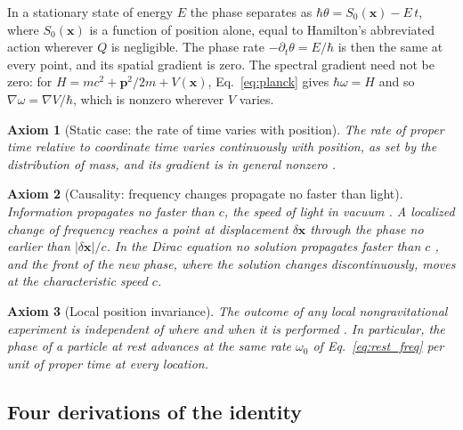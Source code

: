 \documentclass[aps,prd,onecolumn,tightenlines,nofootinbib,notitlepage,11pt,floatfix]{revtex4-2}
\theoremstyle{indentedtheorem}
\newtheorem{axiom}{Axiom}
\begin{document}
\noindent In a stationary state of energy $E$ the phase separates as $\hbar\theta=S_0(\mathbf{x})-E\,t$, where $S_0(\mathbf{x})$ is a function of position alone, equal to Hamilton's abbreviated action \citep{Goldstein2002Classical} wherever $Q$ is negligible. The phase rate $-\partial_t\theta=E/\hbar$ is then the same at every point, and its spatial gradient is zero. The spectral gradient need not be zero: for $H=mc^2+\mathbf{p}^2/2m+V(\mathbf{x})$, Eq.~\eqref{eq:planck} gives $\hbar\omega=H$ and so $\nabla\omega=\nabla V/\hbar$, which is nonzero wherever $V$ varies.

\begin{axiom}[Static case: the rate of time varies with position]\label{ax:nonzero_spectral_gradient}
The rate of proper time relative to coordinate time varies continuously with position, as set by the distribution of mass, and its gradient is in general nonzero \citep{Einstein1907Relativitatsprinzip,Einstein1911Influence,Pound1960Apparent,Bothwell2022Resolving}.
\end{axiom}

\begin{axiom}[Causality: frequency changes propagate no faster than light]\label{ax:causal_propagation}
Information propagates no faster than $c$, the speed of light in vacuum \citep{Einstein1905Electrodynamics}. A localized change of frequency reaches a point at displacement $\delta\mathbf{x}$ through the phase no earlier than $|\delta\mathbf{x}|/c$. In the Dirac equation no solution propagates faster than $c$ \citep{Thaller1992Dirac}, and the front of the new phase, where the solution changes discontinuously, moves at the characteristic speed $c$.
\end{axiom}

\begin{axiom}[Local position invariance]\label{ax:lpi}
The outcome of any local nongravitational experiment is independent of where and when it is performed \citep{Will2014Confrontation}. In particular, the phase of a particle at rest advances at the same rate $\omega_0$ of Eq.~\eqref{eq:rest_freq} per unit of proper time at every location.
\end{axiom}

\subsection{Four derivations of the identity}
\label{sec:deriv}
\end{document}
